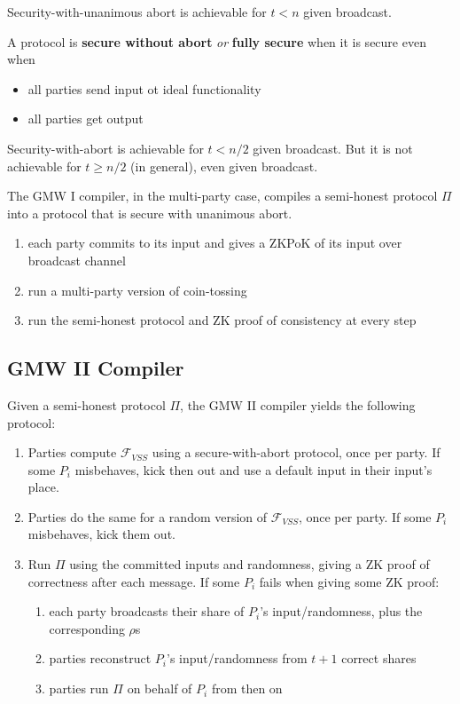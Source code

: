 Security-with-unanimous abort is achievable for $t < n$ given broadcast.

\begin{defn}
A protocol is \textbf{secure without abort} \textit{or} \textbf{fully secure} when it is secure even when 
\begin{itemize}
\item all parties send input ot ideal functionality
\item all parties get output 
\end{itemize}
\end{defn}

Security-with-abort is achievable for $t < n/2$ given broadcast.
But it is not achievable for $t \geq n/2$ (in general), even given broadcast.

The GMW I compiler, in the multi-party case, compiles a semi-honest protocol $\Pi$ into a protocol that is secure with unanimous abort.
\begin{enumerate}
\item each party commits to its input and gives a ZKPoK of its input over broadcast channel 
\item run a multi-party version of coin-tossing
\item run the semi-honest protocol and ZK proof of consistency at every step
\end{enumerate}

\subsection{GMW II Compiler}

\begin{prcl}
Given a semi-honest protocol $\Pi$, the GMW II compiler yields the following protocol:
\begin{enumerate}
\item
Parties compute $\mathcal{F}_{VSS}$ using a secure-with-abort protocol, once per party. If some $P_i$ misbehaves, kick then out and use a default input in their input's place.
\item 
Parties do the same for a random version of $\mathcal{F}_{VSS}$, once per party. If some $P_i$ misbehaves, kick them out.
\item 
Run $\Pi$ using the committed inputs and randomness, giving a ZK proof of correctness after each message. If some $P_i$ fails when giving some ZK proof:
\begin{enumerate}
    \item each party broadcasts their share of $P_i$'s input/randomness, plus the corresponding $\rho$s
    \item parties reconstruct $P_i$'s input/randomness from $t+1$ correct shares
    \item parties run $\Pi$ on behalf of $P_i$ from then on
\end{enumerate}
\end{enumerate}
\end{prcl}

